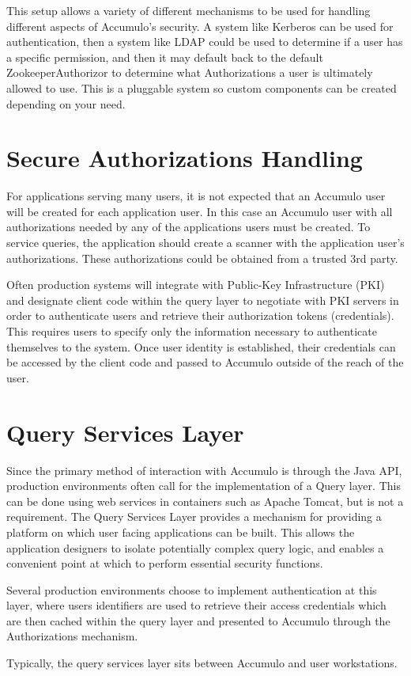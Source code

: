 This setup allows a variety of different mechanisms to be used for handling different aspects of 
Accumulo's security. A system like Kerberos can be used for authentication, then a system like LDAP 
could be used to determine if a user has a specific permission, and then it may default back to the 
default ZookeeperAuthorizor to determine what Authorizations a user is ultimately allowed to use. 
This is a pluggable system so custom components can be created depending on your need.

\section{Secure Authorizations Handling}

For applications serving many users, it is not expected that an Accumulo user
will be created for each application user. In this case an Accumulo user with
all authorizations needed by any of the applications users must be created. To
service queries, the application should create a scanner with the application
user's authorizations. These authorizations could be obtained from a trusted 3rd
party.

Often production systems will integrate with Public-Key Infrastructure (PKI) and
designate client code within the query layer to negotiate with PKI servers in order
to authenticate users and retrieve their authorization tokens (credentials). This
requires users to specify only the information necessary to authenticate themselves
to the system. Once user identity is established, their credentials can be accessed by
the client code and passed to Accumulo outside of the reach of the user.

\section{Query Services Layer}

Since the primary method of interaction with Accumulo is through the Java API,
production environments often call for the implementation of a Query layer. This
can be done using web services in containers such as Apache Tomcat, but is not a
requirement. The Query Services Layer provides a mechanism for providing a
platform on which user facing applications can be built. This allows the application
designers to isolate potentially complex query logic, and enables a convenient point
at which to perform essential security functions.

Several production environments choose to implement authentication at this layer,
where users identifiers are used to retrieve their access credentials which are then
cached within the query layer and presented to Accumulo through the
Authorizations mechanism.

Typically, the query services layer sits between Accumulo and user workstations.
